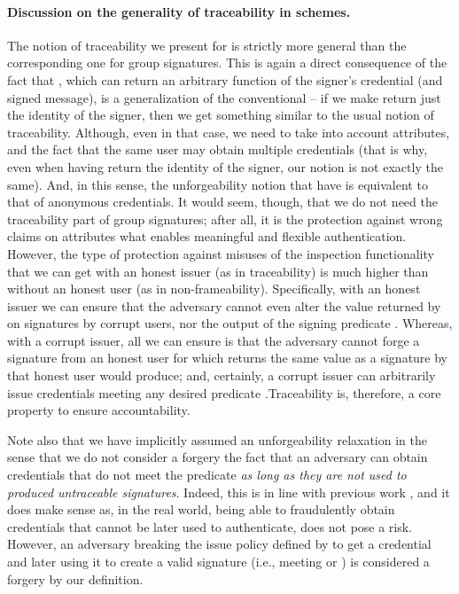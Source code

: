 \paragraph{Discussion on the generality of traceability in \UAS schemes.} %
The notion of traceability we present for \UAS is strictly more general than
the corresponding one for group signatures. This is again a direct
consequence of the fact that \Inspect, which can return an arbitrary function
of the signer's credential (and signed message), is a generalization of the
conventional \Open -- if we make \Inspect return just the identity of the
signer, then we get something similar to the usual notion of traceability.
Although, even in that case, we need to take into account attributes, and the
fact that the same user may obtain multiple credentials (that is why, even when
having \Inspect return the identity of the signer, our notion is not exactly
the same). And, in this sense, the unforgeability notion that \UAS have is
equivalent to that of anonymous credentials. It would seem, though, that we do
not need the traceability part of group signatures; after all, it is the
protection against wrong claims on attributes what enables meaningful and
flexible authentication. However, the type of protection against misuses of
the inspection functionality that we can get with an honest issuer (as in
traceability) is much higher than without an honest user (as in
non-frameability). Specifically, with an honest issuer we can ensure that
the adversary cannot even alter the value returned by \Inspect on signatures
by corrupt users, nor the output of the signing predicate \feval. Whereas, with
a corrupt issuer, all we can ensure is that
the adversary cannot forge a signature from an honest user for which \Inspect
returns the same value as a signature by that honest user would produce; and,
certainly, a corrupt issuer can arbitrarily issue credentials meeting any
desired predicate \feval .Traceability is, therefore, a core property to ensure
accountability.

Note also that we have implicitly assumed an unforgeability relaxation in the
sense that we do not consider a forgery the fact that an adversary can obtain
credentials that do not meet the \fissue predicate \emph{as long as they are
  not used to produced untraceable signatures}. Indeed, this is in line with
previous work \cite[Section 3.3.3]{ckl+15}, and it does make sense as, in the
real world, being able to fraudulently obtain credentials that cannot be later
used to authenticate, does not pose a risk. However, an adversary breaking
the issue policy defined by \fissue to get a credential and later using it to
create a valid signature (i.e., meeting \feval or \finsp) is considered a
forgery by our definition.

